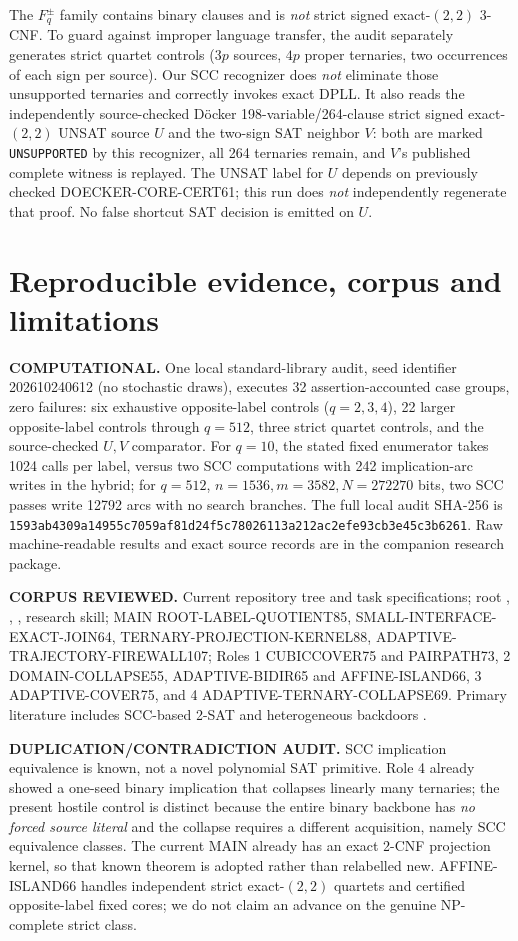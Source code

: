 \documentclass[11pt]{article}
\begin{document}
The $F_q^\pm$ family contains binary clauses and is \emph{not} strict signed exact-$(2,2)$ 3-CNF. To guard against improper language transfer, the audit separately generates strict quartet controls ($3p$ sources, $4p$ proper ternaries, two occurrences of each sign per source). Our SCC recognizer does \emph{not} eliminate those unsupported ternaries and correctly invokes exact DPLL. It also reads the independently source-checked D\"ocker 198-variable/264-clause strict signed exact-$(2,2)$ UNSAT source $U$ and the two-sign SAT neighbor $V$: both are marked \texttt{UNSUPPORTED} by this recognizer, all 264 ternaries remain, and $V$'s published complete witness is replayed. The UNSAT label for $U$ depends on previously checked DOECKER-CORE-CERT61; this run does \emph{not} independently regenerate that proof. No false shortcut SAT decision is emitted on $U$.

\section{Reproducible evidence, corpus and limitations}
\textbf{COMPUTATIONAL.} One local standard-library audit, seed identifier 202610240612 (no stochastic draws), executes 32 assertion-accounted case groups, zero failures: six exhaustive opposite-label controls ($q=2,3,4$), 22 larger opposite-label controls through $q=512$, three strict quartet controls, and the source-checked $U,V$ comparator. For $q=10$, the stated fixed enumerator takes 1024 calls per label, versus two SCC computations with 242 implication-arc writes in the hybrid; for $q=512$, $n=1536,m=3582,N=272270$ bits, two SCC passes write 12792 arcs with no search branches. The full local audit SHA-256 is \texttt{1593ab4309a14955c7059af81d24f5c78026113a212ac2efe93cb3e45c3b6261}. Raw machine-readable results and exact source records are in the companion research package.

\textbf{CORPUS REVIEWED.} Current repository tree and task specifications; root , , , research skill; MAIN ROOT-LABEL-QUOTIENT85, SMALL-INTERFACE-EXACT-JOIN64, TERNARY-PROJECTION-KERNEL88, ADAPTIVE-TRAJECTORY-FIREWALL107; Roles 1 CUBICCOVER75 and PAIRPATH73, 2 DOMAIN-COLLAPSE55, ADAPTIVE-BIDIR65 and AFFINE-ISLAND66, 3 ADAPTIVE-COVER75, and 4 ADAPTIVE-TERNARY-COLLAPSE69. Primary literature includes SCC-based 2-SAT \cite{apt} and heterogeneous backdoors \cite{hetero}.

\textbf{DUPLICATION/CONTRADICTION AUDIT.} SCC implication equivalence is known, not a novel polynomial SAT primitive. Role 4 already showed a one-seed binary implication that collapses linearly many ternaries; the present hostile control is distinct because the entire binary backbone has \emph{no forced source literal} and the collapse requires a different acquisition, namely SCC equivalence classes. The current MAIN already has an exact 2-CNF projection kernel, so that known theorem is adopted rather than relabelled new. AFFINE-ISLAND66 handles independent strict exact-$(2,2)$ quartets and certified opposite-label fixed cores; we do not claim an advance on the genuine NP-complete strict class.
\end{document}
